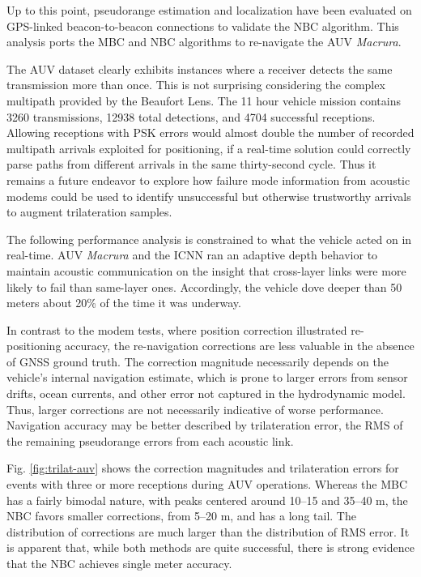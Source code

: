 Up to this point, pseudorange estimation and localization have been evaluated on GPS-linked beacon-to-beacon connections to validate the NBC algorithm.
This analysis ports the MBC and NBC algorithms to re-navigate the AUV \emph{Macrura}.

The AUV dataset clearly exhibits instances where a receiver detects the same transmission more than once.
This is not surprising considering the complex multipath provided by the Beaufort Lens.
The 11 hour vehicle mission contains 3260 transmissions, 12938 total detections, and 4704 successful receptions.
Allowing receptions with PSK errors would almost double the number of recorded multipath arrivals exploited for positioning, if a real-time solution could correctly parse paths from different arrivals in the same thirty-second cycle.
Thus it remains a future endeavor to explore how failure mode information from acoustic modems could be used to identify unsuccessful but otherwise trustworthy arrivals to augment trilateration samples.

The following performance analysis is constrained to what the vehicle acted on in real-time.
AUV \emph{Macrura} and the ICNN ran an adaptive depth behavior to maintain acoustic communication on the insight that cross-layer links were more likely to fail than same-layer ones.
Accordingly, the vehicle dove deeper than 50 meters about 20\% of the time it was underway.

In contrast to the modem tests, where position correction illustrated re-positioning accuracy, the re-navigation corrections are less valuable in the absence of GNSS ground truth.
The correction magnitude necessarily depends on the vehicle's internal navigation estimate, which is prone to larger errors from sensor drifts, ocean currents, and other error not captured in the hydrodynamic model.
Thus, larger corrections are not necessarily indicative of worse performance.
Navigation accuracy may be better described by trilateration error, the RMS of the remaining pseudorange errors from each acoustic link.

Fig. \ref{fig:trilat-auv} shows the correction magnitudes and trilateration errors for events with three or more receptions during AUV operations.
Whereas the MBC has a fairly bimodal nature, with peaks centered around 10--15 and 35--40 m, the NBC favors smaller corrections, from 5--20 m, and has a long tail.
The distribution of corrections are much larger than the distribution of RMS error.
It is apparent that, while both methods are quite successful, there is strong evidence that the NBC achieves single meter accuracy.

